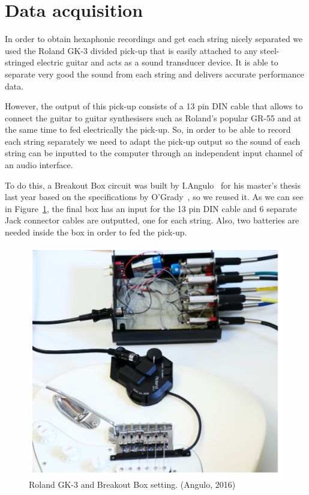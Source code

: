 \section{Data acquisition}
In order to obtain hexaphonic recordings and get each string nicely separated we used the Roland GK-3 divided pick-up that is easily attached to any steel-stringed electric guitar and acts as a sound transducer device. It is able to separate very good the sound from each string and delivers accurate performance data.

However, the output of this pick-up consists of a 13 pin DIN cable that allows to connect the guitar to guitar synthesisers such as Roland's popular GR-55 and at the same time to fed electrically the pick-up. So, in order to be able to record each string separately we need to adapt the pick-up output so the sound of each string can be inputted to the computer through an independent input channel of an audio interface.

To do this, a Breakout Box circuit was built by I.Angulo~\cite{Angulo2016} for his master's thesis last year based on the specifications by O'Grady~\cite{OGrady2009}, so we reused it. As we can see in Figure~\ref{fig:gk3}, the final box has an input for the 13 pin DIN cable and 6 separate Jack connector cables are outputted, one for each string. Also, two batteries are needed inside the box in order to fed the pick-up. 

\begin{figure}[ht!]
\centering
\includegraphics[width=\textwidth]{Figures/gk3.png}
\caption{Roland GK-3 and Breakout Box setting. (Angulo, 2016)}
\label{fig:gk3}
\end{figure}

